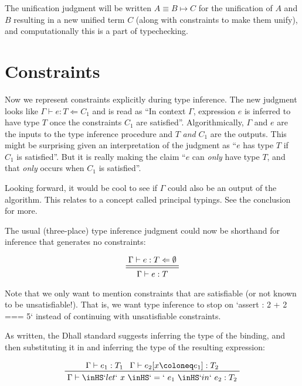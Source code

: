 \documentclass[11pt, twoside, reqno]{book}
\begin{document}
The unification judgment will be written \(A \equiv B \mapsto C\) for the unification of \(A\) and \(B\) resulting in a new unified term \(C\) (along with constraints to make them unify), and computationally this is a part of typechecking.

\section{Constraints}

Now we represent constraints explicitly during type inference.
The new judgment looks like \(\Gamma \vdash e : T \Leftarrow C_1\) and is read as ``In context \(\Gamma\), expression \(e\) is inferred to have type \(T\) once the constraints \(C_1\) are satisfied''.
Algorithmically, \(\Gamma\) and \(e\) are the inputs to the type inference procedure and \(T\) \emph{and} \(C_1\) are the outputs.
This might be surprising given an interpretation of the judgment as ``\(e\) has type \(T\) if \(C_1\) is satisfied''.
But it is really making the claim ``\(e\) can \emph{only} have type \(T\), and that \emph{only} occurs when \(C_1\) is satisfied''.

\bigskip
\begin{mdframed}[style=Note]
Looking forward, it would be cool to see if \(\Gamma\) could also be an output of the algorithm.
This relates to a concept called principal typings.
See the conclusion for more.
\end{mdframed}

The usual (three-place) type inference judgment could now be shorthand for inference that generates no constraints:

\begin{displaymath}
\prftree[double]{\Gamma \vdash e : T \Leftarrow \emptyset}{\Gamma \vdash e : T}
\end{displaymath}

Note that we only want to mention constraints that are satisfiable (or not known to be unsatisfiable!).
That is, we want type inference to stop on \inHS`assert : 2 + 2 === 5` instead of continuing with unsatisfiable constraints.

As written, the Dhall standard suggests inferring the type of the binding, and then substituting it in and inferring the type of the resulting expression:

\begin{displaymath}
\prftree{\Gamma \vdash e_1 : T_1}{\Gamma \vdash e_2[x \coloneq e_1] : T_2}{\Gamma \vdash \inHS`let`\ x\ \inHS`=`\ e_1\ \inHS`in`\ e_2 : T_2}
\end{displaymath}
\end{document}
